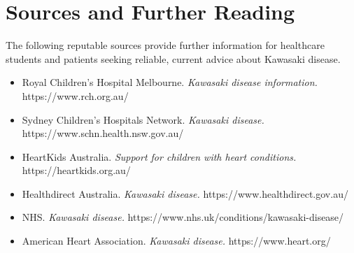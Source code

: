 \section*{Sources and Further Reading}
The following reputable sources provide further information for healthcare students and patients seeking reliable, current advice about Kawasaki disease.
\begin{itemize}
    \item Royal Children's Hospital Melbourne. \textit{Kawasaki disease information.} https://www.rch.org.au/
    \item Sydney Children's Hospitals Network. \textit{Kawasaki disease.} https://www.schn.health.nsw.gov.au/
    \item HeartKids Australia. \textit{Support for children with heart conditions.} https://heartkids.org.au/
    \item Healthdirect Australia. \textit{Kawasaki disease.} https://www.healthdirect.gov.au/
    \item NHS. \textit{Kawasaki disease.} https://www.nhs.uk/conditions/kawasaki-disease/
    \item American Heart Association. \textit{Kawasaki disease.} https://www.heart.org/
\end{itemize}
